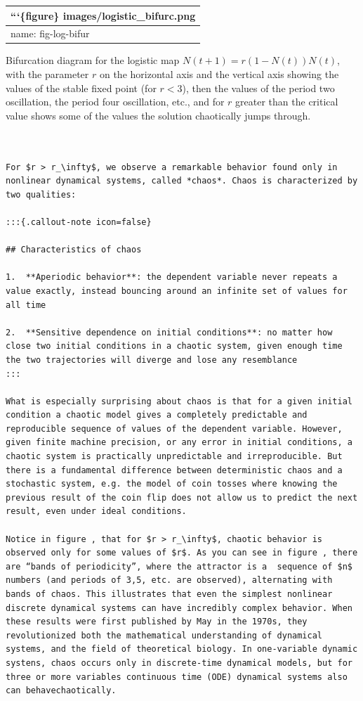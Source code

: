 \documentclass[
  letterpaper,
  DIV=11,
  numbers=noendperiod]{scrreprt}
\begin{document}
\begin{longtable}[]{@{}l@{}}
\toprule()
```\{figure\} images/logistic\_bifurc.png \\
\midrule()
\endhead
name: fig-log-bifur \\
\bottomrule()
\end{longtable}

Bifurcation diagram for the logistic map \(N(t+1) = r(1 - N(t)) N(t)\),
with the parameter \(r\) on the horizontal axis and the vertical axis
showing the values of the stable fixed point (for \(r<3\)), then the
values of the period two oscillation, the period four oscillation, etc.,
and for \(r\) greater than the critical value shows some of the values
the solution chaotically jumps through.

\begin{verbatim}


For $r > r_\infty$, we observe a remarkable behavior found only in nonlinear dynamical systems, called *chaos*. Chaos is characterized by two qualities:

:::{.callout-note icon=false} 

## Characteristics of chaos

1.  **Aperiodic behavior**: the dependent variable never repeats a value exactly, instead bouncing around an infinite set of values for all time

2.  **Sensitive dependence on initial conditions**: no matter how close two initial conditions in a chaotic system, given enough time the two trajectories will diverge and lose any resemblance
:::

What is especially surprising about chaos is that for a given initial condition a chaotic model gives a completely predictable and reproducible sequence of values of the dependent variable. However, given finite machine precision, or any error in initial conditions, a chaotic system is practically unpredictable and irreproducible. But there is a fundamental difference between deterministic chaos and a stochastic system, e.g. the model of coin tosses where knowing the previous result of the coin flip does not allow us to predict the next result, even under ideal conditions.

Notice in figure , that for $r > r_\infty$, chaotic behavior is observed only for some values of $r$. As you can see in figure , there are “bands of periodicity”, where the attractor is a  sequence of $n$ numbers (and periods of 3,5, etc. are observed), alternating with bands of chaos. This illustrates that even the simplest nonlinear discrete dynamical systems can have incredibly complex behavior. When these results were first published by May in the 1970s, they revolutionized both the mathematical understanding of dynamical systems, and the field of theoretical biology. In one-variable dynamic systens, chaos occurs only in discrete-time dynamical models, but for three or more variables continuous time (ODE) dynamical systems also can behavechaotically.


\end{verbatim}
\end{document}
